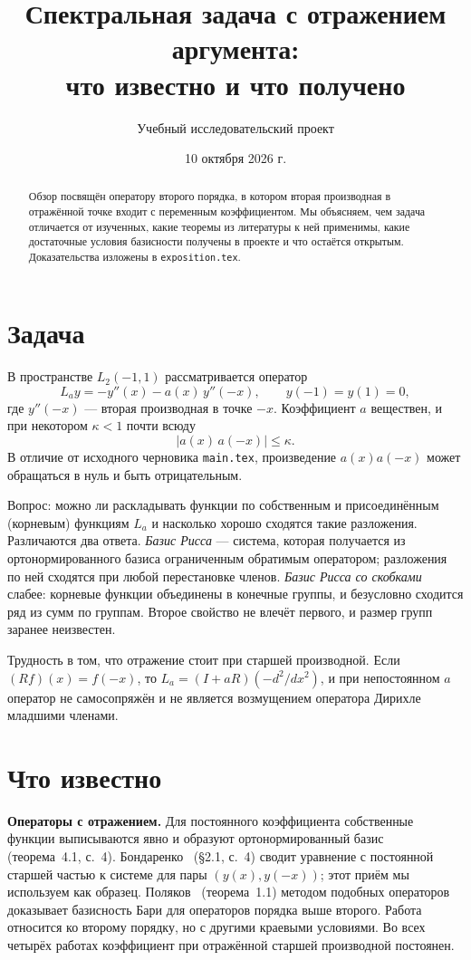 \documentclass[12pt,a4paper]{article}
\title{Спектральная задача с отражением аргумента:\\
что известно и что получено}
\author{Учебный исследовательский проект}
\date{10 октября 2026 г.}
\begin{document}
\sloppy
\maketitle
\begin{abstract}
Обзор посвящён оператору второго порядка, в котором вторая производная в отражённой
точке входит с переменным коэффициентом. Мы объясняем, чем задача отличается от
изученных, какие теоремы из литературы к ней применимы, какие достаточные условия
базисности получены в проекте и что остаётся открытым. Доказательства изложены в
\texttt{exposition.tex}.
\end{abstract}

\section{Задача}
В пространстве $L_2(-1,1)$ рассматривается оператор
\[
 L_ay=-y''(x)-a(x)\,y''(-x),\qquad y(-1)=y(1)=0,
\]
где $y''(-x)$ --- вторая производная в точке $-x$. Коэффициент $a$ веществен, и при
некотором $\kappa<1$ почти всюду
\begin{equation}\label{eq:bound}
 |a(x)\,a(-x)|\le\kappa .
\end{equation}
В отличие от исходного черновика \texttt{main.tex}, произведение $a(x)a(-x)$ может
обращаться в нуль и быть отрицательным.

Вопрос: можно ли раскладывать функции по собственным и присоединённым (корневым)
функциям $L_a$ и насколько хорошо сходятся такие разложения. Различаются два ответа.
\emph{Базис Рисса} --- система, которая получается из ортонормированного базиса
ограниченным обратимым оператором; разложения по ней сходятся при любой перестановке
членов. \emph{Базис Рисса со скобками} слабее: корневые функции объединены в конечные
группы, и безусловно сходится ряд из сумм по группам. Второе свойство не влечёт первого,
и размер групп заранее неизвестен.

Трудность в том, что отражение стоит при старшей производной. Если $(Rf)(x)=f(-x)$, то
$L_a=(I+aR)(-d^2/dx^2)$, и при непостоянном $a$ оператор не самосопряжён и не является
возмущением оператора Дирихле младшими членами.

\section{Что известно}
\textbf{Операторы с отражением.} Для постоянного коэффициента собственные функции
выписываются явно и образуют ортонормированный базис~\cite{S2} (теорема~4.1, с.~4).
Бондаренко~\cite{S1} (\S2.1, с.~4) сводит уравнение с постоянной старшей частью к системе
для пары $(y(x),y(-x))$; этот приём мы используем как образец. Поляков~\cite{S5}
(теорема~1.1) методом подобных операторов доказывает базисность Бари для операторов
порядка выше второго. Работа~\cite{S6} относится ко второму порядку, но с другими
краевыми условиями. Во всех четырёх работах коэффициент при отражённой старшей производной
постоянен.
\end{document}
